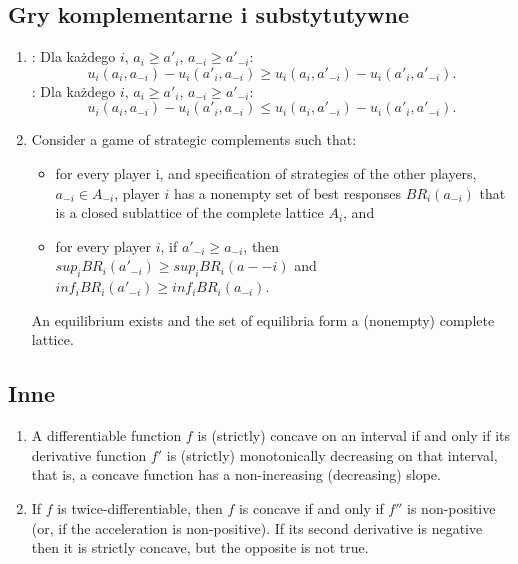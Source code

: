 \documentclass{article}
\newcommand\wassterm[1]{{\color{blue}{#1}}}
\begin{document}
\subsection{Gry komplementarne i substytutywne}
\begin{enumerate}
 \item 
 	\wassterm{Komplementarność}: Dla każdego $i$, $a_i \geq a'_i$, $a_{-i} \geq a'_{-i} $:
 	$$u_i(a_i, a_{-i}) - u_i(a'_i, a_{-i}) \geq  u_i(a_i, a'_{-i}) - u_i(a'_i, a'_{-i}).$$
 	\wassterm{Substytutywność}: Dla każdego $i$, $a_i \geq a'_i$, $a_{-i} \geq a'_{-i} $:
 	$$u_i(a_i, a_{-i}) - u_i(a'_i, a_{-i}) \leq  u_i(a_i, a'_{-i}) - u_i(a'_i, a'_{-i}).$$
 \item Consider a game of strategic complements such that:
  \begin{itemize}
   \item for every player i, and specification of strategies of the other players, $a_{-i} \in A_{-i}$, player $i$ has a
nonempty set of best responses $BR_i(a_{-i})$ that is a closed sublattice of the complete lattice $A_i$, and
   \item for every player $i$, if $a'_{-i} \geq a_{-i}$, then $sup_{i} BR_{i}(a'_{-i}) \geq sup_{i} BR_{i}(a-{-i})$ and $inf_i BR_i(a'_{-i}) \geq inf_i BR_i(a_{-i})$.
  \end{itemize}
  An equilibrium exists and the set of equilibria form a (nonempty) complete lattice.
\end{enumerate}

\subsection{Inne}
\begin{enumerate}
 \item  A differentiable function $f$ is (strictly) concave on an interval if and only if its derivative function $f'$ is (strictly) monotonically decreasing on that interval, that is, a concave function has a non-increasing (decreasing) slope.
 \item If $f$ is twice-differentiable, then $f$ is concave if and only if $f''$ is non-positive (or, if the acceleration is non-positive). If its second derivative is negative then it is strictly concave, but the opposite is not true.
\end{enumerate}
\end{document}
